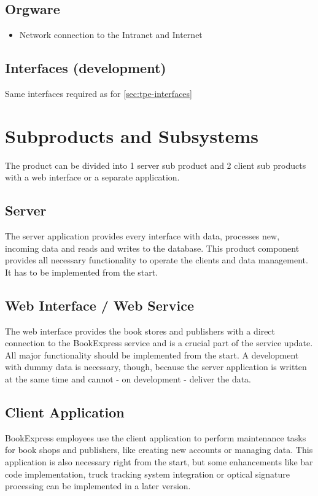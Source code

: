 \documentclass[11pt,a4paper,oneside,svgnames]{report}
\begin{document}
\section{Orgware}
	\begin{itemize}
		\item Network connection to the Intranet and Internet
	\end{itemize}
\section{Interfaces (development)}
Same interfaces required as for \ref{sec:tpe-interfaces}

\chapter{Subproducts and Subsystems}
The product can be divided into 1 server sub product and 2 client sub products with a web interface or a separate application.

\section{Server}
The server application provides every interface with data, processes new, incoming data and reads and writes to the database. This product component provides all necessary functionality to operate the clients and data management. It has to be implemented from the start.

\section{Web Interface / Web Service}
The web interface provides the book stores and publishers with a direct connection to the BookExpress service and is a crucial part of the service update. All major functionality should be implemented from the start. A development with dummy data is necessary, though, because the server application is written at the same time and cannot - on development - deliver the data.

\section{Client Application}
BookExpress employees use the client application to perform maintenance tasks for book shops and publishers, like creating new accounts or managing data. This application is also necessary right from the start, but some enhancements like bar code implementation, truck tracking system integration or optical signature processing can be implemented in a later version.
\end{document}
